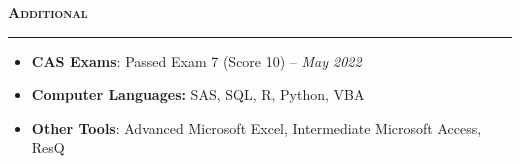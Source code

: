 \documentclass[11pt,letterpaper]{article}
\newcommand{\sectline}{\vspace{5pt}\hrule height 1.5pt\vspace{5pt}}
\newcommand{\heading}[1]{{\fontsize{12pt}{13pt} {\textbf{\textsc{#1}}}}}
\begin{document}
\heading{Additional}\sectline
\begin{itemize}
	\item \textbf{CAS Exams}: Passed Exam 7 (Score 10) -- \textit{May 2022}
	\item \textbf{Computer Languages:} SAS, SQL, R, Python, VBA
	\item \textbf{Other Tools}: Advanced Microsoft Excel, Intermediate Microsoft Access, ResQ
\end{itemize}
\end{document}
